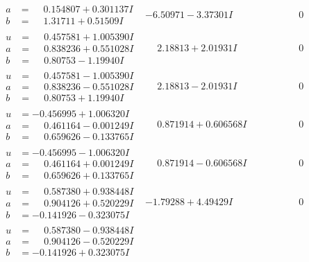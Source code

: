 \documentclass[1p]{elsarticle_modified}
\theoremstyle{definition}
\begin{document}
$$\begin{array}{c|c|c}
\begin{aligned}
a &= \phantom{-}0.154807 + 0.301137 I \\
b &= \phantom{-}1.31711 + 0.51509 I\end{aligned}
 & -6.50971 - 3.37301 I & \phantom{-0.000000 } 0 \\ \hline\begin{aligned}
u &= \phantom{-}0.457581 + 1.005390 I \\
a &= \phantom{-}0.838236 + 0.551028 I \\
b &= \phantom{-}0.80753 - 1.19940 I\end{aligned}
 & \phantom{-}2.18813 + 2.01931 I & \phantom{-0.000000 } 0 \\ \hline\begin{aligned}
u &= \phantom{-}0.457581 - 1.005390 I \\
a &= \phantom{-}0.838236 - 0.551028 I \\
b &= \phantom{-}0.80753 + 1.19940 I\end{aligned}
 & \phantom{-}2.18813 - 2.01931 I & \phantom{-0.000000 } 0 \\ \hline\begin{aligned}
u &= -0.456995 + 1.006320 I \\
a &= \phantom{-}0.461164 - 0.001249 I \\
b &= \phantom{-}0.659626 - 0.133765 I\end{aligned}
 & \phantom{-}0.871914 + 0.606568 I & \phantom{-0.000000 } 0 \\ \hline\begin{aligned}
u &= -0.456995 - 1.006320 I \\
a &= \phantom{-}0.461164 + 0.001249 I \\
b &= \phantom{-}0.659626 + 0.133765 I\end{aligned}
 & \phantom{-}0.871914 - 0.606568 I & \phantom{-0.000000 } 0 \\ \hline\begin{aligned}
u &= \phantom{-}0.587380 + 0.938448 I \\
a &= \phantom{-}0.904126 + 0.520229 I \\
b &= -0.141926 - 0.323075 I\end{aligned}
 & -1.79288 + 4.49429 I & \phantom{-0.000000 } 0 \\ \hline\begin{aligned}
u &= \phantom{-}0.587380 - 0.938448 I \\
a &= \phantom{-}0.904126 - 0.520229 I \\
b &= -0.141926 + 0.323075 I\end{aligned}

\end{array}$$
\end{document}
